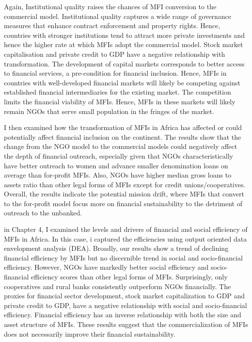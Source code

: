 \documentclass[a4paper, nobind]{templates/ociamthesis}
\begin{document}
Again, Institutional quality raises the chances of MFI conversion to the commercial model. Institutional quality captures a wide range of governance measures that enhance contract enforcement and property rights. Hence, countries with stronger institutions tend to attract more private investments and hence the higher rate at which MFIs adopt the commercial model. Stock market capitalisation and private credit to GDP have a negative relationship with transformation. The development of capital markets corresponds to better access to financial services, a pre-condition for financial inclusion. Hence, MFIs in countries with well-developed financial markets will likely be competing against established financial intermediaries for the existing market. The competition limits the financial viability of MFIs. Hence, MFIs in these markets will likely remain NGOs that serve small population in the fringes of the market.

I then examined how the transformation of MFIs in Africa has affected or could potentially affect financial inclusion on the continent. The results show that the change from the NGO model to the commercial models could negatively affect the depth of financial outreach, especially given that NGOs characteristically have better outreach to women and advance smaller denomination loans on average than for-profit MFIs. Also, NGOs have higher median gross loans to assets ratio than other legal forms of MFIs except for credit unions/cooperatives. Overall, the results indicate the potential mission drift, where MFIs that convert to the for-profit model focus more on financial sustainability to the detriment of outreach to the unbanked.

in Chapter 4, I examined the levels and drivers of financial and social efficiency of MFIs in Africa. In this case, i captured the efficiencies using output oriented data envelopment analysis (DEA). Broadly, our results show a trend of declining financial efficiency by MFIs but no discernible trend in social and socio-financial efficiency. However, NGOs have markedly better social efficiency and socio-financial efficiency scores than other legal forms of MFIs. Surprisingly, only cooperatives and rural banks consistently outperform NGOs financially. The proxies for financial sector development, stock market capitalization to GDP and private credit to GDP, have a negative relationship with social and socio-financial efficiency. Financial efficiency has an inverse relationship with both the size and asset structure of MFIs. These results suggest that the commercialization of MFIs does not necessarily improve their financial sustainability.
\end{document}
